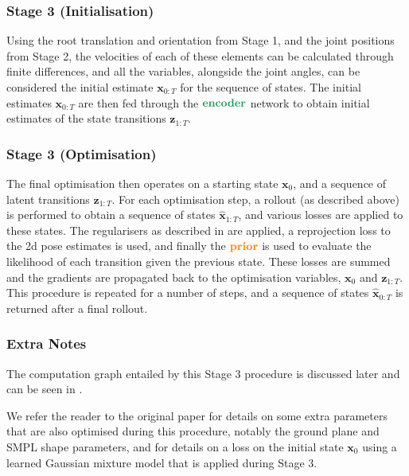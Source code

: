 \subsubsection{Stage 3 (Initialisation)}
Using the root translation and orientation from Stage 1, and the joint positions from Stage 2, the velocities of each of these elements can be calculated through finite differences, and all the variables, alongside the joint angles, can be considered the initial estimate $\mathbf{x}_{0:T}$ for the sequence of states. The initial estimates $\mathbf{x}_{0:T}$ are then fed through the $\textbf{\textcolor{ForestGreen}{encoder}}$ network to obtain initial estimates of the state transitions $\textbf{z}_{1:T}$.

\subsubsection{Stage 3 (Optimisation)}
The final optimisation then operates on a starting state $\mathbf{x}_0$, and a sequence of latent transitions $\textbf{z}_{1:T}$. For each optimisation step, a rollout (as described above) is performed to obtain a sequence of states $\mathbf{\hat{x}}_{1:T}$, and various losses are applied to these states. The regularisers as described in  are applied, a reprojection loss to the 2d pose estimates is used, and finally the $\textbf{\textcolor{orange}{prior}}$ is used to evaluate the likelihood of each transition given the previous state. These losses are summed and the gradients are propagated back to the optimisation variables, $\mathbf{x}_0$ and $\textbf{z}_{1:T}$. This procedure is repeated for a number of steps, and a sequence of states $\mathbf{\hat{x}}_{0:T}$ is returned after a final rollout.


\subsubsection{Extra Notes}
\label{sec:humor_testops_extra_notes}

The computation graph entailed by this Stage 3 procedure is discussed later and can be seen in .

We refer the reader to the original paper \cite{humor} for details on some extra parameters that are also optimised during this procedure, notably the ground plane and SMPL shape parameters, and for details on a loss on the initial state $\mathbf{x}_0$ using a learned Gaussian mixture model that is applied during Stage 3.